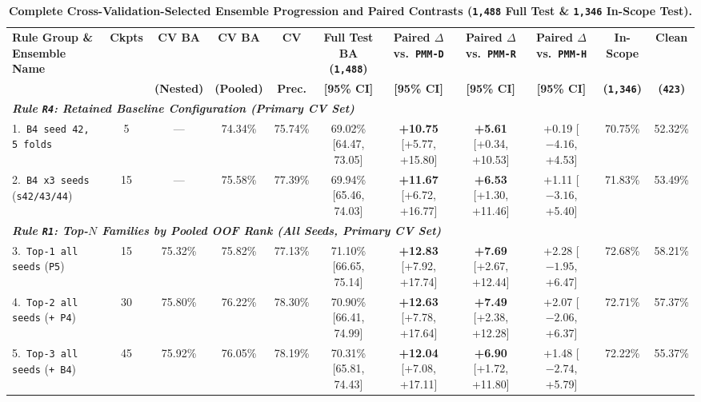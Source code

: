 \documentclass[10pt,a4paper,twocolumn]{article}
\begin{document}
\begin{table}[t!]
  \centering
  \caption{\textbf{Complete Cross-Validation-Selected Ensemble Progression and Paired Contrasts (\texttt{1,488} Full Test \& \texttt{1,346} In-Scope Test).}}
  \label{tab:cv_ensembles}
  \scriptsize
  \begin{tabular}{lcccccccccc}
    \toprule
    \textbf{Rule Group \& Ensemble Name} & \textbf{Ckpts} & \textbf{CV BA} & \textbf{CV BA} & \textbf{CV} & \textbf{Full Test BA (\texttt{1,488})} & \textbf{Paired $\Delta$ vs.\ \texttt{PMM-D}} & \textbf{Paired $\Delta$ vs.\ \texttt{PMM-R}} & \textbf{Paired $\Delta$ vs.\ \texttt{PMM-H}} & \textbf{In-Scope} & \textbf{Clean} \\
     & & \textbf{(Nested)} & \textbf{(Pooled)} & \textbf{Prec.} & \textbf{[95\% CI]} & \textbf{[95\% CI]} & \textbf{[95\% CI]} & \textbf{[95\% CI]} & \textbf{(\texttt{1,346})} & \textbf{(\texttt{423})} \\
    \midrule
    \multicolumn{11}{l}{\textit{\textbf{Rule \texttt{R4}: Retained Baseline Configuration (Primary CV Set)}}} \\
    1.\ \texttt{B4 seed 42, 5 folds} & 5 & --- & 74.34\% & 75.74\% & 69.02\% [64.47, 73.05] & \textbf{+10.75} [+5.77, +15.80] & \textbf{+5.61} [+0.34, +10.53] & +0.19 [$-4.16$, +4.53] & 70.75\% & 52.32\% \\
    2.\ \texttt{B4 x3 seeds} (\texttt{s42/43/44}) & 15 & --- & 75.58\% & 77.39\% & 69.94\% [65.46, 74.03] & \textbf{+11.67} [+6.72, +16.77] & \textbf{+6.53} [+1.30, +11.46] & +1.11 [$-3.16$, +5.40] & 71.83\% & 53.49\% \\
    \midrule
    \multicolumn{11}{l}{\textit{\textbf{Rule \texttt{R1}: Top-$N$ Families by Pooled OOF Rank (All Seeds, Primary CV Set)}}} \\
    3.\ \texttt{Top-1 all seeds} (\texttt{P5}) & 15 & 75.32\% & 75.82\% & 77.13\% & 71.10\% [66.65, 75.14] & \textbf{+12.83} [+7.92, +17.74] & \textbf{+7.69} [+2.67, +12.44] & +2.28 [$-1.95$, +6.47] & 72.68\% & 58.21\% \\
    4.\ \texttt{Top-2 all seeds} (\texttt{+ P4}) & 30 & 75.80\% & 76.22\% & 78.30\% & 70.90\% [66.41, 74.99] & \textbf{+12.63} [+7.78, +17.64] & \textbf{+7.49} [+2.38, +12.28] & +2.07 [$-2.06$, +6.37] & 72.71\% & 57.37\% \\
    5.\ \texttt{Top-3 all seeds} (\texttt{+ B4}) & 45 & 75.92\% & 76.05\% & 78.19\% & 70.31\% [65.81, 74.43] & \textbf{+12.04} [+7.08, +17.11] & \textbf{+6.90} [+1.72, +11.80] & +1.48 [$-2.74$, +5.79] & 72.22\% & 55.37\% \\

\end{tabular}
\end{table}
\end{document}
